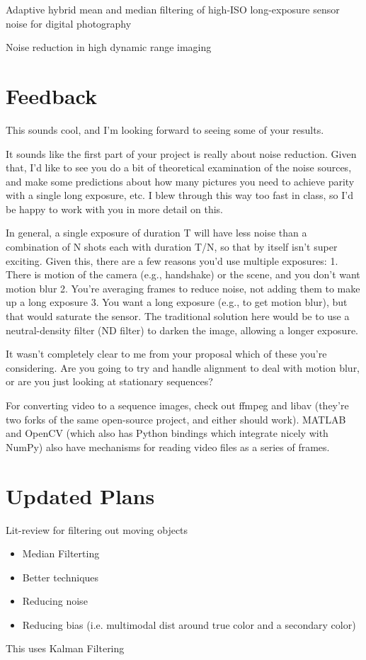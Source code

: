 \cite{motion_comp_averaging}

Adaptive hybrid mean and median filtering of high-ISO long-exposure sensor noise for
digital photography
\cite{hyrbid_mean_median_filtering}

Noise reduction in high dynamic range imaging
\cite{noise_HDR}

\section{Feedback}
This sounds cool, and I'm looking forward to seeing some of your results.

It sounds like the first part of your project is really about noise reduction.  Given that, I'd like
to see you do a bit of theoretical examination of the noise sources, and make some predictions about
how many pictures you need to achieve parity with a single long exposure, etc.  I blew through this
way too fast in class, so I'd be happy to work with you in more detail on this.

In general, a single exposure of duration T will have less noise than a combination of N shots each
with duration T/N, so that by itself isn't super exciting.  Given this, there are a few reasons
you'd use multiple exposures:
1. There is motion of the camera (e.g., handshake) or the scene, and you don't want motion blur
2. You're averaging frames to reduce noise, not adding them to make up a long exposure
3. You want a long exposure (e.g., to get motion blur), but that would saturate the sensor.  The
traditional solution here would be to use a neutral-density filter (ND filter) to darken the image,
allowing a longer exposure.

It wasn't completely clear to me from your proposal which of these you're considering.  Are you
going to try and handle alignment to deal with motion blur, or are you just looking at stationary
sequences?

For converting video to a sequence images, check out ffmpeg and libav (they're two forks of the same
open-source project, and either should work).  MATLAB and OpenCV (which also has Python bindings
which integrate nicely with NumPy) also have mechanisms for reading video files as a series of
frames.

\section{Updated Plans}
Lit-review for filtering out moving objects
\begin{itemize}
\item Median Filterting
\item Better techniques
\item Reducing noise
\item Reducing bias (i.e. multimodal dist around true color and a secondary color)
\end{itemize}

This uses Kalman Filtering \cite{moving_object_removal}


